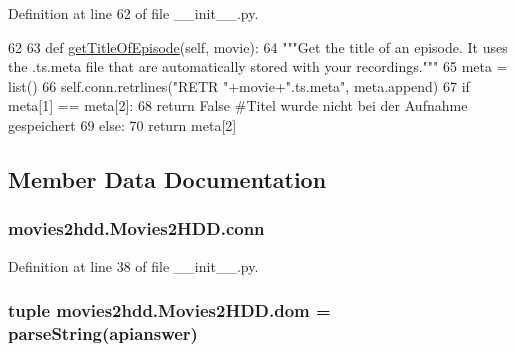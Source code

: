 Definition at line 62 of file \-\_\-\-\_\-init\-\_\-\-\_\-.\-py.


\begin{DoxyCode}
62 
63     \textcolor{keyword}{def }\hyperlink{classmovies2hdd_1_1_movies2_h_d_d_af70b18fab503d288570e9c97e3e0cc46}{getTitleOfEpisode}(self, movie):
64         \textcolor{stringliteral}{"""Get the title of an episode. It uses the .ts.meta file that are automatically stored with your
       recordings."""}
65         meta = list()
66         self.conn.retrlines(\textcolor{stringliteral}{"RETR "}+movie+\textcolor{stringliteral}{".ts.meta"}, meta.append)
67         \textcolor{keywordflow}{if} meta[1] == meta[2]:
68             \textcolor{keywordflow}{return} \textcolor{keyword}{False} \textcolor{comment}{#Titel wurde nicht bei der Aufnahme gespeichert}
69         \textcolor{keywordflow}{else}:
70             \textcolor{keywordflow}{return} meta[2]

\end{DoxyCode}


\subsection{Member Data Documentation}
\hypertarget{classmovies2hdd_1_1_movies2_h_d_d_a0b93dbfa80fc06d13d8cdad9ea7bae0b}{
\subsubsection[{conn}]{\setlength{\rightskip}{0pt plus 5cm}movies2hdd.\-Movies2\-H\-D\-D.\-conn}}\label{classmovies2hdd_1_1_movies2_h_d_d_a0b93dbfa80fc06d13d8cdad9ea7bae0b}


Definition at line 38 of file \-\_\-\-\_\-init\-\_\-\-\_\-.\-py.

\hypertarget{classmovies2hdd_1_1_movies2_h_d_d_a23cc104177423d3145c753fb423fbf7f}{
\subsubsection[{dom}]{\setlength{\rightskip}{0pt plus 5cm}tuple movies2hdd.\-Movies2\-H\-D\-D.\-dom = parse\-String(apianswer)\hspace{0.3cm}{\ttfamily [static]}}}\label{classmovies2hdd_1_1_movies2_h_d_d_a23cc104177423d3145c753fb423fbf7f}


